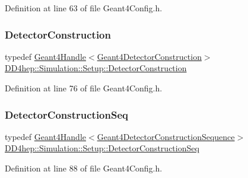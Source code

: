 Definition at line 63 of file Geant4\+Config.\+h.

\hypertarget{namespace_d_d4hep_1_1_simulation_1_1_setup_a8405db8ef232c0fb524d029682e94005}{}\label{namespace_d_d4hep_1_1_simulation_1_1_setup_a8405db8ef232c0fb524d029682e94005} 
\subsubsection{\texorpdfstring{Detector\+Construction}{DetectorConstruction}}
{\footnotesize\ttfamily typedef \hyperlink{class_d_d4hep_1_1_simulation_1_1_geant4_handle}{Geant4\+Handle}$<$\hyperlink{class_d_d4hep_1_1_simulation_1_1_geant4_detector_construction}{Geant4\+Detector\+Construction}$>$ \hyperlink{namespace_d_d4hep_1_1_simulation_1_1_setup_a8405db8ef232c0fb524d029682e94005}{D\+D4hep\+::\+Simulation\+::\+Setup\+::\+Detector\+Construction}}



Definition at line 76 of file Geant4\+Config.\+h.

\hypertarget{namespace_d_d4hep_1_1_simulation_1_1_setup_a66188950ce6f5c228993102224d2552a}{}\label{namespace_d_d4hep_1_1_simulation_1_1_setup_a66188950ce6f5c228993102224d2552a} 
\subsubsection{\texorpdfstring{Detector\+Construction\+Seq}{DetectorConstructionSeq}}
{\footnotesize\ttfamily typedef \hyperlink{class_d_d4hep_1_1_simulation_1_1_geant4_handle}{Geant4\+Handle}$<$\hyperlink{class_d_d4hep_1_1_simulation_1_1_geant4_detector_construction_sequence}{Geant4\+Detector\+Construction\+Sequence}$>$ \hyperlink{namespace_d_d4hep_1_1_simulation_1_1_setup_a66188950ce6f5c228993102224d2552a}{D\+D4hep\+::\+Simulation\+::\+Setup\+::\+Detector\+Construction\+Seq}}



Definition at line 88 of file Geant4\+Config.\+h.

\hypertarget{namespace_d_d4hep_1_1_simulation_1_1_setup_ad2f4a62fb2f0e3977ad95f8414ed8d26}{}\label{namespace_d_d4hep_1_1_simulation_1_1_setup_ad2f4a62fb2f0e3977ad95f8414ed8d26} 
